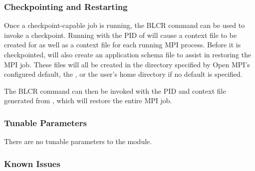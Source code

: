 \subsubsection{Checkpointing and Restarting}

Once a checkpoint-capable job is running, the BLCR command
 can be used to invoke a checkpoint.  Running
 with the PID of  will cause a
context file to be created for  as well as a context file
for each running MPI process.  Before it is checkpointed, 
will also create an application schema file to assist in restoring the
MPI job.  These files will all be created in the directory specified
by Open MPI's configured default, the , or
the user's home directory if no default is specified.

The BLCR  command can then be invoked with the PID
and context file generated from , which will restore the
entire MPI job.


\subsubsection{Tunable Parameters}

There are no tunable parameters to the   module.

 
\subsubsection{Known Issues}


